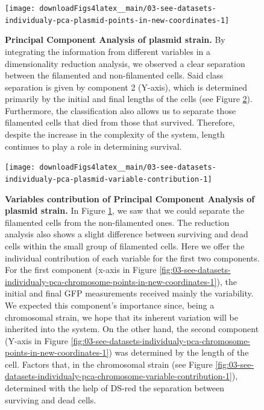 \documentclass[a4paper, nobind]{templates/ociamthesis}
\begin{document}
\begin{figure}[H]
\texttt{[image: downloadFigs4latex\_\_main/03-see-datasets-individualy-pca-plasmid-points-in-new-coordinates-1]} \caption[Principal Component Analysis of plasmid strain.]{\textbf{Principal Component Analysis of plasmid strain.} By integrating the information from different variables in a dimensionality reduction analysis, we observed a clear separation between the filamented and non-filamented cells. Said class separation is given by component 2 (Y-axis), which is determined primarily by the initial and final lengths of the cells (see Figure \ref{fig:03-see-datasets-individualy-pca-plasmid-variable-contribution-1}). Furthermore, the classification also allows us to separate those filamented cells that died from those that survived. Therefore, despite the increase in the complexity of the system, length continues to play a role in determining survival.}\label{fig:03-see-datasets-individualy-pca-plasmid-points-in-new-coordinates-1}
\end{figure}





\begin{figure}[H]
\texttt{[image: downloadFigs4latex\_\_main/03-see-datasets-individualy-pca-plasmid-variable-contribution-1]} \caption[Variables contribution of Principal Component Analysis of plasmid strain.]{\textbf{Variables contribution of Principal Component Analysis of plasmid strain.} In Figure \ref{fig:03-see-datasets-individualy-pca-plasmid-points-in-new-coordinates-1}, we saw that we could separate the filamented cells from the non-filamented ones. The reduction analysis also shows a slight difference between surviving and dead cells within the small group of filamented cells. Here we offer the individual contribution of each variable for the first two components. For the first component (x-axis in Figure \ref{fig:03-see-datasets-individualy-pca-chromosome-points-in-new-coordinates-1}), the initial and final GFP measurements received mainly the variability. We expected this component's importance since, being a chromosomal strain, we hope that its inherent variation will be inherited into the system. On the other hand, the second component (Y-axis in Figure \ref{fig:03-see-datasets-individualy-pca-chromosome-points-in-new-coordinates-1}) was determined by the length of the cell. Factors that, in the chromosomal strain (see Figure \ref{fig:03-see-datasets-individualy-pca-chromosome-variable-contribution-1}), determined with the help of DS-red the separation between surviving and dead cells.}\label{fig:03-see-datasets-individualy-pca-plasmid-variable-contribution-1}
\end{figure}
\end{document}

